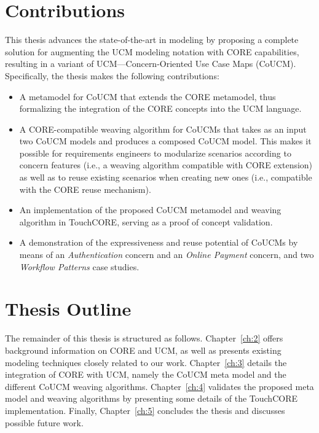 \section{Contributions}

This thesis advances the state-of-the-art in modeling by proposing a complete solution for augmenting the UCM modeling notation with CORE capabilities, resulting in a variant of UCM---Concern-Oriented Use Case Maps (CoUCM). Specifically, the thesis makes the following contributions:

\begin{itemize}

\item A metamodel for CoUCM that extends the CORE metamodel, thus formalizing the integration of the CORE concepts into the UCM language.

\item A CORE-compatible weaving algorithm for CoUCMs that takes as an input two CoUCM models and produces a composed CoUCM model. This makes it possible for requirements engineers to modularize scenarios according to concern features (i.e., a weaving algorithm compatible with CORE extension) as well as to reuse existing scenarios when creating new ones (i.e., compatible with the CORE reuse mechanism).

\item An implementation of the proposed CoUCM metamodel and weaving algorithm in TouchCORE, serving as a proof of concept validation.

\item A demonstration of the expressiveness and reuse potential of CoUCMs by means of an \emph{Authentication} concern and an \emph{Online Payment} concern, and two \emph{Workflow Patterns} case studies.

\end{itemize}

\section{Thesis Outline}

The remainder of this thesis is structured as follows. Chapter~\ref{ch:2} offers background information on CORE and UCM, as well as presents existing modeling techniques closely related to our work. Chapter~\ref{ch:3} details the integration of CORE with UCM, namely the CoUCM meta model and the different CoUCM weaving algorithms. Chapter~\ref{ch:4} validates the proposed meta model
and weaving algorithms by presenting some details of the TouchCORE implementation. Finally, Chapter~\ref{ch:5} concludes the thesis and discusses possible future work.
